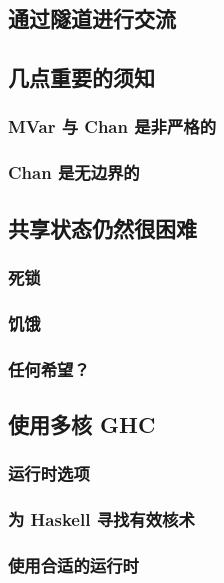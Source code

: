 \documentclass[./main.tex]{subfiles}
\begin{document}
\begin{lstlisting}[language=Haskell]

\end{lstlisting}



\begin{lstlisting}[language=Haskell]

\end{lstlisting}



\begin{lstlisting}[language=Haskell]

\end{lstlisting}

\subsection*{通过隧道进行交流}

\subsection*{几点重要的须知}

\subsubsection*{MVar 与 Chan 是非严格的}

\subsubsection*{Chan 是无边界的}

\subsection*{共享状态仍然很困难}

\subsubsection*{死锁}

\subsubsection*{饥饿}

\subsubsection*{任何希望？}

\subsection*{使用多核 GHC}

\subsubsection*{运行时选项}

\subsubsection*{为 Haskell 寻找有效核术}

\subsubsection*{使用合适的运行时}
\end{document}
